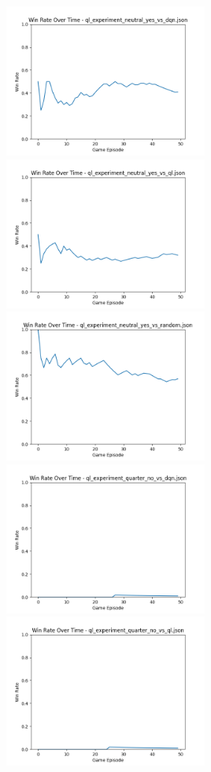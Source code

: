 \includegraphics[width=0.5\textwidth]{images/win_rate_ql_experiment_neutral_yes_vs_dqn.png} 
\includegraphics[width=0.5\textwidth]{images/win_rate_ql_experiment_neutral_yes_vs_ql.png} 
\includegraphics[width=0.5\textwidth]{images/win_rate_ql_experiment_neutral_yes_vs_random.png} 
\includegraphics[width=0.5\textwidth]{images/win_rate_ql_experiment_quarter_no_vs_dqn.png} 
\includegraphics[width=0.5\textwidth]{images/win_rate_ql_experiment_quarter_no_vs_ql.png} 
